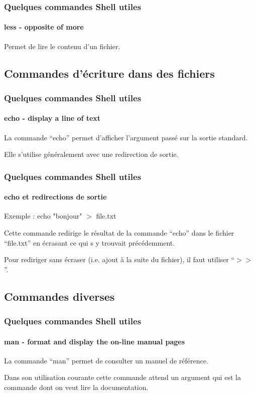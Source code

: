 \documentclass{beamer}
\begin{document}
            \begin{frame}
                \frametitle{Quelques commandes Shell utiles}
                \framesubtitle{less - opposite of more}
                Permet de lire le contenu d'un fichier.
            \end{frame}
             
        \subsection[Commandes d'écriture dans des fichiers]{Commandes d'écriture dans des fichiers}
        
            \begin{frame}
                \frametitle{Quelques commandes Shell utiles}
                \framesubtitle{echo - display a line of text}
                La commande \foreignquote{french}{echo} permet d'afficher l'argument passé sur la sortie standard.
                
                Elle s'utilise généralement avec une redirection de sortie.
            \end{frame}
                
            \begin{frame}
                \frametitle{Quelques commandes Shell utiles}
                \framesubtitle{echo et redirections de sortie}
                Exemple : echo "bonjour" $>$ file.txt
                
                Cette commande redirige le résultat de la commande \foreignquote{french}{echo} dans le fichier \foreignquote{french}{file.txt} en écrasant ce qui s y trouvait précédemment.
                
                Pour rediriger sans écraser (i.e. ajout à la suite du fichier), il faut utiliser \foreignquote{french}{$>>$}.
            \end{frame}
        
        \subsection[Commandes diverses]{Commandes diverses}
        
            \begin{frame}
                \frametitle{Quelques commandes Shell utiles}
                \framesubtitle{man - format and display the on-line manual pages}
                La commande \foreignquote{french}{man} permet de consulter un manuel de référence.
                
                Dans son utilisation courante cette commande attend un argument qui est la commande dont on veut lire la documentation.
                
            \end{frame}
            
\end{document}
